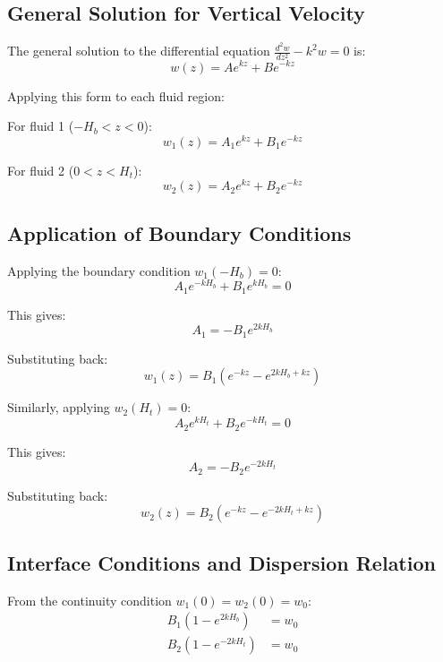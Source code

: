 \documentclass[12pt,a4paper]{article}
\begin{document}
\subsection{General Solution for Vertical Velocity}
The general solution to the differential equation $\frac{d^2 w}{dz^2} - k^2 w = 0$ is:
\begin{equation}
w(z) = Ae^{kz} + Be^{-kz}
\end{equation}

Applying this form to each fluid region:

For fluid 1 ($-H_b < z < 0$):
\begin{equation}
w_1(z) = A_1e^{kz} + B_1e^{-kz}
\end{equation}

For fluid 2 ($0 < z < H_t$):
\begin{equation}
w_2(z) = A_2e^{kz} + B_2e^{-kz}
\end{equation}

\subsection{Application of Boundary Conditions}
Applying the boundary condition $w_1(-H_b) = 0$:
\begin{equation}
A_1e^{-kH_b} + B_1e^{kH_b} = 0
\end{equation}

This gives:
\begin{equation}
A_1 = -B_1e^{2kH_b}
\end{equation}

Substituting back:
\begin{equation}
w_1(z) = B_1(e^{-kz} - e^{2kH_b+kz})
\end{equation}

Similarly, applying $w_2(H_t) = 0$:
\begin{equation}
A_2e^{kH_t} + B_2e^{-kH_t} = 0
\end{equation}

This gives:
\begin{equation}
A_2 = -B_2e^{-2kH_t}
\end{equation}

Substituting back:
\begin{equation}
w_2(z) = B_2(e^{-kz} - e^{-2kH_t+kz})
\end{equation}

\subsection{Interface Conditions and Dispersion Relation}
From the continuity condition $w_1(0) = w_2(0) = w_0$:
\begin{align}
B_1(1 - e^{2kH_b}) &= w_0 \\
B_2(1 - e^{-2kH_t}) &= w_0
\end{align}
\end{document}
